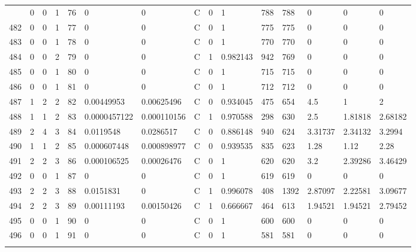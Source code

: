 \begin{latin}
\begin{longtable}{lllllllllllllll}
\begin{comment}
	481 & 0  & 0   & 1  & 76  & 0              & 0              & C & 0  & 1        & 788  & 788  & 0       & 0       & 0       \\
	482 & 0  & 0   & 1  & 77  & 0              & 0              & C & 0  & 1        & 775  & 775  & 0       & 0       & 0       \\
	483 & 0  & 0   & 1  & 78  & 0              & 0              & C & 0  & 1        & 770  & 770  & 0       & 0       & 0       \\
	484 & 0  & 0   & 2  & 79  & 0              & 0              & C & 1  & 0.982143 & 942  & 769  & 0       & 0       & 0       \\
	485 & 0  & 0   & 1  & 80  & 0              & 0              & C & 0  & 1        & 715  & 715  & 0       & 0       & 0       \\
	486 & 0  & 0   & 1  & 81  & 0              & 0              & C & 0  & 1        & 712  & 712  & 0       & 0       & 0       \\
	487 & 1  & 2   & 2  & 82  & 0.00449953     & 0.00625496     & C & 0  & 0.934045 & 475  & 654  & 4.5     & 1       & 2       \\
	488 & 1  & 1   & 2  & 83  & 0.0000457122   & 0.000110156    & C & 1  & 0.970588 & 298  & 630  & 2.5     & 1.81818 & 2.68182 \\
	489 & 2  & 4   & 3  & 84  & 0.0119548      & 0.0286517      & C & 0  & 0.886148 & 940  & 624  & 3.31737 & 2.34132 & 3.2994  \\
	490 & 1  & 1   & 2  & 85  & 0.000607448    & 0.000898977    & C & 0  & 0.939535 & 835  & 623  & 1.28    & 1.12    & 2.28    \\
	491 & 2  & 2   & 3  & 86  & 0.000106525    & 0.00026476     & C & 0  & 1        & 620  & 620  & 3.2     & 2.39286 & 3.46429 \\
	492 & 0  & 0   & 1  & 87  & 0              & 0              & C & 0  & 1        & 619  & 619  & 0       & 0       & 0       \\
	493 & 2  & 2   & 3  & 88  & 0.0151831      & 0              & C & 1  & 0.996078 & 408  & 1392 & 2.87097 & 2.22581 & 3.09677 \\
	494 & 2  & 2   & 3  & 89  & 0.00111193     & 0.00150426     & C & 1  & 0.666667 & 464  & 613  & 1.94521 & 1.94521 & 2.79452 \\
	495 & 0  & 0   & 1  & 90  & 0              & 0              & C & 0  & 1        & 600  & 600  & 0       & 0       & 0       \\
	496 & 0  & 0   & 1  & 91  & 0              & 0              & C & 0  & 1        & 581  & 581  & 0       & 0       & 0       \\

\end{comment}
\end{longtable}
\end{latin}
